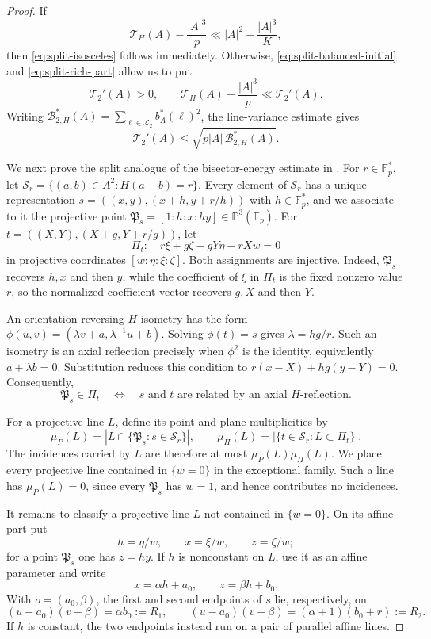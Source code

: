 \documentclass[11pt]{article}
\newcommand{\F}{\mathbb F}
\begin{document}
\begin{proof}
If
\[
\mathcal T_H(A)-\frac{|A|^3}{p} \ll |A|^2+\frac{|A|^3}{K},
\]
then \eqref{eq:split-isosceles} follows immediately. Otherwise, \eqref{eq:split-balanced-initial} and \eqref{eq:split-rich-part} allow us to put
\[
\mathcal T_2'(A)>0, \qquad \mathcal T_H(A)-\frac{|A|^3}{p}\ll \mathcal T_2'(A).
\]
Writing $\mathcal B_{2,H}^*(A) =\sum_{\ell\in\mathcal L_2}b_A^*(\ell)^2$, the line-variance estimate gives
\begin{equation}\label{eq:split-X-B2}
\mathcal T_2'(A)\le\sqrt{p|A|\,\mathcal B_{2,H}^*(A)}.
\end{equation}

We next prove the split analogue of the bisector-energy estimate in \cite[Sections~6.1--6.3]{MPPRS}.  For $r\in\F_p^*$, let $\mathcal S_r=\{(a,b)\in A^2:H(a-b)=r\}$. Every element of $\mathcal S_r$ has a unique representation $s=((x,y),(x+h,y+r/h))$ with $h\in\F_p^*$, and we associate to it the projective point $\mathfrak P_s=[1:h:x:hy]\in\mathbb P^3(\F_p)$. For $t=((X,Y),(X+g,Y+r/g))$, let
\[
 \Pi_t:\quad
 r\xi+g\zeta-gY\eta-rXw=0
\]
in projective coordinates $[w:\eta:\xi:\zeta]$. Both assignments are injective.  Indeed, $\mathfrak P_s$ recovers $h,x$ and then $y$, while the coefficient of $\xi$ in $\Pi_t$ is the fixed
nonzero value $r$, so the normalized coefficient vector recovers $g,X$ and then $Y$.

An orientation-reversing $H$-isometry has the form $\phi(u,v)=(\lambda v+a,\lambda^{-1}u+b)$. Solving $\phi(t)=s$ gives $\lambda=hg/r$.  Such an isometry is an
axial reflection precisely when $\phi^2$ is the identity, equivalently
$a+\lambda b=0$.  Substitution reduces this condition to $r(x-X)+hg(y-Y)=0$. Consequently,
\begin{equation}
 \label{eq:split-incidence}
 \mathfrak P_s\in\Pi_t
 \quad\Longleftrightarrow\quad
 s\text{ and }t\text{ are related by an axial }H\text{-reflection}.
\end{equation}

For a projective line $L$, define its point and plane multiplicities by
\[
 \mu_P(L)=|L\cap\{\mathfrak P_s:s\in \mathcal S_r\}|,
 \qquad
 \mu_\Pi(L)=|\{t\in \mathcal S_r:L\subset\Pi_t\}|.
\]
The incidences carried by $L$ are therefore at most $\mu_P(L)\mu_\Pi(L)$.  We place every projective line contained in $\{w=0\}$ in the exceptional family.  Such a line has $\mu_P(L)=0$, since every $\mathfrak P_s$ has $w=1$, and hence contributes no incidences.

It remains to classify a projective line $L$ not contained in $\{w=0\}$.  On its affine part put
\[
 h=\eta/w,\qquad x=\xi/w,\qquad z=\zeta/w;
\]
for a point $\mathfrak P_s$ one has $z=hy$.  If $h$ is nonconstant on $L$, use it as an affine parameter and write
\[
x=\alpha h+a_0,\qquad z=\beta h+b_0.
\]
With $o=(a_0,\beta)$, the first and second endpoints of $s$ lie, respectively, on
\begin{equation}
 \label{eq:split-two-levels}
 (u-a_0)(v-\beta)=\alpha b_0:=R_1,
 \qquad
 (u-a_0)(v-\beta)=(\alpha+1)(b_0+r):=R_2.
\end{equation}
If $h$ is constant, the two endpoints instead run on a pair of parallel affine lines.


\end{proof}
\end{document}
